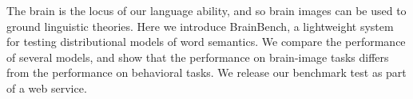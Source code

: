 The brain is the locus of our language ability, and so brain images can be used to ground linguistic theories. Here we introduce BrainBench, a lightweight system for testing distributional models of word semantics. We compare the performance of several models, and show that the performance on brain-image tasks differs from the performance on behavioral tasks. We release our benchmark test as part of a web service.
